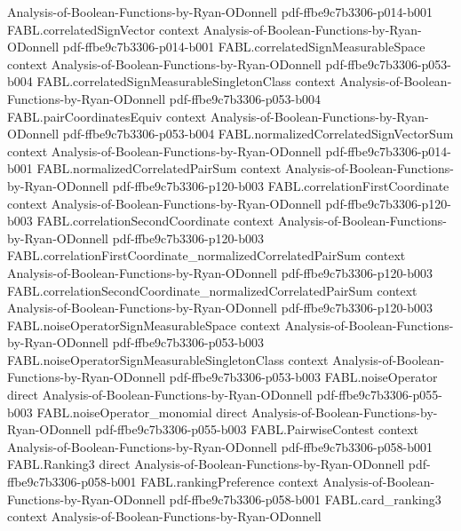 \begin{theorem}
  {Analysis-of-Boolean-Functions-by-Ryan-ODonnell}
  {pdf-ffbe9c7b3306-p014-b001}
\proofstep
  {FABL.correlatedSignVector}
  {context}
  {Analysis-of-Boolean-Functions-by-Ryan-ODonnell}
  {pdf-ffbe9c7b3306-p014-b001}
\proofstep
  {FABL.correlatedSignMeasurableSpace}
  {context}
  {Analysis-of-Boolean-Functions-by-Ryan-ODonnell}
  {pdf-ffbe9c7b3306-p053-b004}
\proofstep
  {FABL.correlatedSignMeasurableSingletonClass}
  {context}
  {Analysis-of-Boolean-Functions-by-Ryan-ODonnell}
  {pdf-ffbe9c7b3306-p053-b004}
\proofstep
  {FABL.pairCoordinatesEquiv}
  {context}
  {Analysis-of-Boolean-Functions-by-Ryan-ODonnell}
  {pdf-ffbe9c7b3306-p053-b004}
\proofstep
  {FABL.normalizedCorrelatedSignVectorSum}
  {context}
  {Analysis-of-Boolean-Functions-by-Ryan-ODonnell}
  {pdf-ffbe9c7b3306-p014-b001}
\proofstep
  {FABL.normalizedCorrelatedPairSum}
  {context}
  {Analysis-of-Boolean-Functions-by-Ryan-ODonnell}
  {pdf-ffbe9c7b3306-p120-b003}
\proofstep
  {FABL.correlationFirstCoordinate}
  {context}
  {Analysis-of-Boolean-Functions-by-Ryan-ODonnell}
  {pdf-ffbe9c7b3306-p120-b003}
\proofstep
  {FABL.correlationSecondCoordinate}
  {context}
  {Analysis-of-Boolean-Functions-by-Ryan-ODonnell}
  {pdf-ffbe9c7b3306-p120-b003}
\proofstep
  {FABL.correlationFirstCoordinate_normalizedCorrelatedPairSum}
  {context}
  {Analysis-of-Boolean-Functions-by-Ryan-ODonnell}
  {pdf-ffbe9c7b3306-p120-b003}
\proofstep
  {FABL.correlationSecondCoordinate_normalizedCorrelatedPairSum}
  {context}
  {Analysis-of-Boolean-Functions-by-Ryan-ODonnell}
  {pdf-ffbe9c7b3306-p120-b003}
\proofstep
  {FABL.noiseOperatorSignMeasurableSpace}
  {context}
  {Analysis-of-Boolean-Functions-by-Ryan-ODonnell}
  {pdf-ffbe9c7b3306-p053-b003}
\proofstep
  {FABL.noiseOperatorSignMeasurableSingletonClass}
  {context}
  {Analysis-of-Boolean-Functions-by-Ryan-ODonnell}
  {pdf-ffbe9c7b3306-p053-b003}
\proofstep
  {FABL.noiseOperator}
  {direct}
  {Analysis-of-Boolean-Functions-by-Ryan-ODonnell}
  {pdf-ffbe9c7b3306-p055-b003}
\proofstep
  {FABL.noiseOperator_monomial}
  {direct}
  {Analysis-of-Boolean-Functions-by-Ryan-ODonnell}
  {pdf-ffbe9c7b3306-p055-b003}
\proofstep
  {FABL.PairwiseContest}
  {context}
  {Analysis-of-Boolean-Functions-by-Ryan-ODonnell}
  {pdf-ffbe9c7b3306-p058-b001}
\proofstep
  {FABL.Ranking3}
  {direct}
  {Analysis-of-Boolean-Functions-by-Ryan-ODonnell}
  {pdf-ffbe9c7b3306-p058-b001}
\proofstep
  {FABL.rankingPreference}
  {context}
  {Analysis-of-Boolean-Functions-by-Ryan-ODonnell}
  {pdf-ffbe9c7b3306-p058-b001}
\proofstep
  {FABL.card_ranking3}
  {context}
  {Analysis-of-Boolean-Functions-by-Ryan-ODonnell}

\end{theorem}
